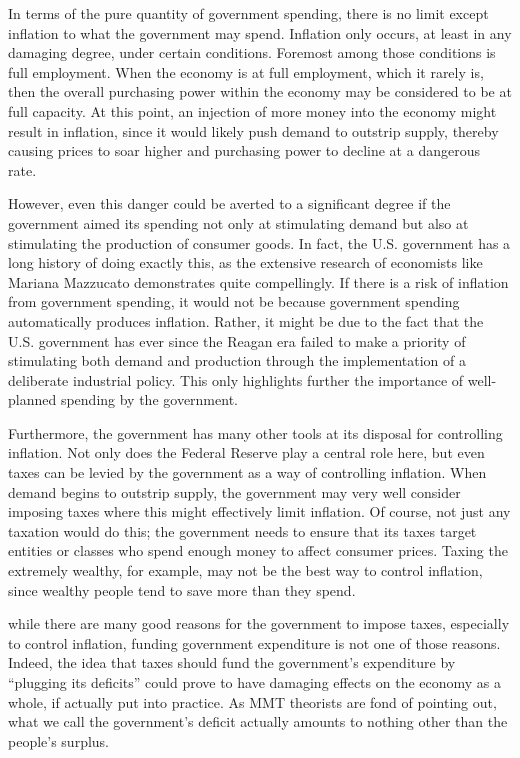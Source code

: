 \documentclass[
]{book}
\begin{document}
In terms of the pure quantity of government spending, there is no limit except inflation to what the government may spend. Inflation only occurs, at least in any damaging degree, under certain conditions. Foremost among those conditions is full employment. When the economy is at full employment, which it rarely is, then the overall purchasing power within the economy may be considered to be at full capacity. At this point, an injection of more money into the economy might result in inflation, since it would likely push demand to outstrip supply, thereby causing prices to soar higher and purchasing power to decline at a dangerous rate.

However, even this danger could be averted to a significant degree if the government aimed its spending not only at stimulating demand but also at stimulating the production of consumer goods. In fact, the U.S. government has a long history of doing exactly this, as the extensive research of economists like Mariana Mazzucato demonstrates quite compellingly. If there is a risk of inflation from government spending, it would not be because government spending automatically produces inflation. Rather, it might be due to the fact that the U.S. government has ever since the Reagan era failed to make a priority of stimulating both demand and production through the implementation of a deliberate industrial policy. This only highlights further the importance of well-planned spending by the government.

Furthermore, the government has many other tools at its disposal for controlling inflation. Not only does the Federal Reserve play a central role here, but even taxes can be levied by the government as a way of controlling inflation. When demand begins to outstrip supply, the government may very well consider imposing taxes where this might effectively limit inflation. Of course, not just any taxation would do this; the government needs to ensure that its taxes target entities or classes who spend enough money to affect consumer prices. Taxing the extremely wealthy, for example, may not be the best way to control inflation, since wealthy people tend to save more than they spend.

while there are many good reasons for the government to impose taxes, especially to control inflation, funding government expenditure is not one of those reasons. Indeed, the idea that taxes should fund the government's expenditure by ``plugging its deficits'' could prove to have damaging effects on the economy as a whole, if actually put into practice. As MMT theorists are fond of pointing out, what we call the government's deficit actually amounts to nothing other than the people's surplus.
\end{document}
